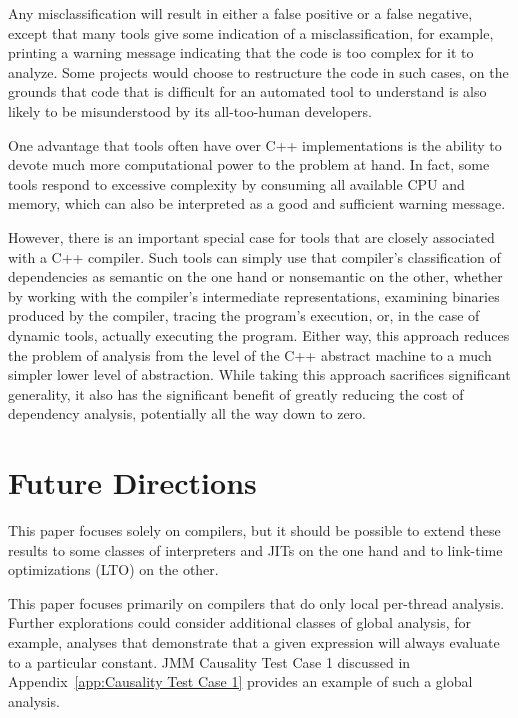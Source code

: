 \documentclass[10]{article}
\begin{document}
Any misclassification will result in either a false positive or
a false negative, except that many tools give some indication of a
misclassification, for example, printing a warning message indicating
that the code is too complex for it to analyze.
Some projects would choose to restructure the code in such cases, on the
grounds that code that is difficult for an automated tool to understand
is also likely to be misunderstood by its all-too-human developers.

One advantage that tools often have over C++ implementations is the
ability to devote much more computational power to the problem at hand.
In fact, some tools respond to excessive complexity by consuming all
available CPU and memory, which can also be interpreted as a good and
sufficient warning message.

However, there is an important special case for tools that are closely
associated with a C++ compiler.
Such tools can simply use that compiler's classification of
dependencies as semantic on the one hand or nonsemantic on the
other, whether by working with the compiler's intermediate
representations, examining binaries produced by the compiler, tracing
the program's execution, or, in the case of dynamic tools, actually
executing the program.
Either way, this approach reduces the problem of analysis from the
level of the C++ abstract machine to a much simpler lower level of
abstraction.
While taking this approach sacrifices significant generality, it also
has the significant benefit of greatly reducing the cost of dependency
analysis, potentially all the way down to zero.

\section{Future Directions}
\label{sec:Future Directions}

This paper focuses solely on compilers, but it should be possible to
extend these results to some classes of interpreters and JITs on the
one hand and to link-time optimizations (LTO) on the other.

This paper focuses primarily on compilers that do only local per-thread
analysis.
Further explorations could consider additional classes of global analysis,
for example, analyses that demonstrate that a given expression will
always evaluate to a particular constant.
JMM Causality Test Case 1 discussed in
Appendix~\ref{app:Causality Test Case 1}
provides an example of such a global analysis.
\end{document}
